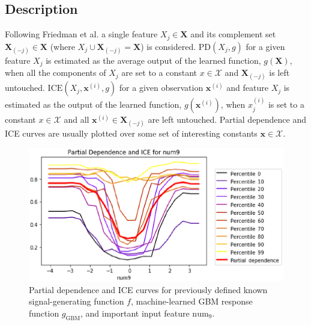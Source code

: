 \documentclass[11pt]{asaproc}
\begin{document}
\subsection{Description}
	
Following Friedman et al. a single feature $X_j \in \mathbf{X}$ and its complement set $\mathbf{X}_{(-j)} \in \mathbf{X}$ (where $X_j \cup \mathbf{X}_{(-j)} = \mathbf{X}$) is considered. $\text{PD}(X_j, g)$ for a given feature $X_j$ is estimated as the average output of the learned function, $g(\mathbf{X})$, when all the components of $X_j$ are set to a constant $x \in \mathcal{X}$ and $\mathbf{X}_{(-j)}$ is left untouched. $\text{ICE}(X_j, \mathbf{x}^{(i)}, g)$ for a given observation $\mathbf{x}^{(i)}$ and feature $X_j$ is estimated as the output of the learned function, $g(\mathbf{x}^{(i)})$, when $x^{(i)}_j$ is set to a constant $x \in \mathcal{X}$ and all $\mathbf{x}^{(i)} \in \mathbf{X}_{(-j)}$ are left untouched. Partial dependence and ICE curves are usually plotted over some set of interesting constants $\mathbf{x} \in \mathcal{X}$. 

\begin{figure}[htb]
	\begin{center}
		\includegraphics[scale=0.5]{img/figure_4.eps}
		\caption{Partial dependence and ICE curves for previously defined known signal-generating function $f$,  machine-learned GBM response function $g_{\text{GBM}}$, and important input feature $\text{num}_9$.}
		\label{fig:pdp_ice}
	\end{center}
\end{figure}
\end{document}
